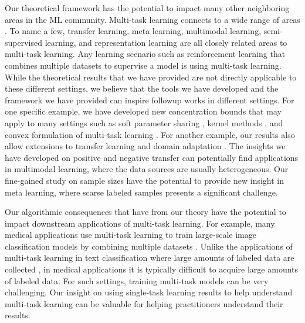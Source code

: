 Our theoretical framework has the potential to impact many other neighboring areas in the ML community.
Multi-task learning connects to a wide range of areas \cite{V20}.
To name a few, transfer learning, meta learning, multimodal learning, semi-supervised learning, and representation learning are all closely related areas to multi-task learning.
Any learning scenario such as reinforcement learning \cite{YKGLHF20} that combines multiple datasets to supervise a model is using multi-task learning.
While the theoretical results that we have provided are not directly applicable to these different settings, we believe that the tools we have developed and the framework we have provided can inspire followup works in different settings.
For one specific example, we have developed new concentration bounds that may apply to many settings such as soft parameter sharing \cite{R17} , kernel methods \cite{EMP05}, and convex formulation of multi-task learning \cite{ZY14}.
For another example, our results also allow extensions to transfer learning and domain adaptation \cite{K18}.
The insights we have developed on positive and negative transfer can potentially find applications in multimodal learning, where the data sources are usually heterogeneous.
Our fine-gained study on sample sizes have the potential to provide new insight in meta learning, where scarse labeled samples presents a significant challenge.

Our algorithmic consequences that have from our theory have the potential to impact downstream applications of multi-task learning.
For example, many medical applications use multi-task learning to train large-scale image classification models by combining multiple datasets \cite{chexnet17,EA20}.
Unlike the applications of multi-task learning in text classification where large amounts of labeled data are collected \cite{GLUE}, in medical applications it is typically difficult to acquire large amounts of labeled data.
For such settings, training multi-task models can be very challenging.
Our insight on using single-task learning results to help understand multi-task learning can be valuable for helping practitioners understand their results.
